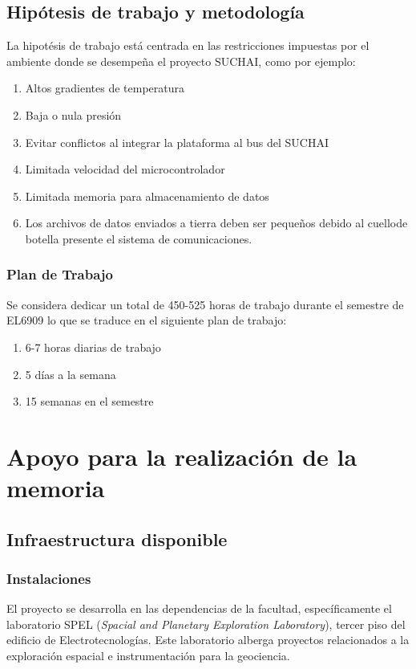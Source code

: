 \documentclass[11pt,letterpaper]{article}
\begin{document}
\subsection{Hipótesis de trabajo y metodología}
La hipot\'esis de trabajo está centrada en las restricciones impuestas por el ambiente donde se desempeña el proyecto SUCHAI, como por ejemplo:
\begin{enumerate}
\item Altos gradientes de temperatura
\item Baja o nula presión
\item Evitar conflictos al integrar la plataforma al bus del SUCHAI
\item Limitada velocidad del microcontrolador
\item Limitada memoria para almacenamiento de datos
\item Los archivos de datos enviados a tierra deben ser pequeños debido al cuellode botella presente el sistema de comunicaciones.
\end{enumerate}

\subsubsection{Plan de Trabajo}
Se considera dedicar un total de 450-525 horas de trabajo durante el semestre de EL6909 lo que se traduce en el siguiente plan de trabajo:
\begin{enumerate}
\item 6-7 horas diarias de trabajo
\item 5 días a la semana
\item 15 semanas en el semestre
\end{enumerate}

\section{Apoyo para la realización de la memoria}
\subsection{Infraestructura disponible}

\subsubsection{Instalaciones}
El proyecto se desarrolla en las dependencias de la facultad, específicamente el laboratorio SPEL (\textit{Spacial and Planetary Exploration Laboratory}), tercer piso del edificio de Electrotecnologías. Este laboratorio alberga proyectos relacionados a la exploración espacial e instrumentación para la geociencia.
\end{document}
